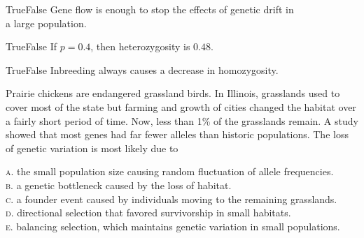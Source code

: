 \documentclass[letterpaper]{tufte-handout}
\begin{document}
\bigskip

\noindent True\hspace{1em}False\hspace{1em} Gene flow is enough to stop the effects of genetic drift in  \\
\noindent {}  a large population.

\bigskip

\noindent True\hspace{1em}False\hspace{1em} If $p=0.4$, then heterozygosity is $0.48$.

\bigskip

\noindent True\hspace{1em}False\hspace{1em} Inbreeding always causes a
decrease in homozygosity.

\bigskip
\noindent Prairie chickens are endangered grassland birds. In Illinois, 
grasslands used to cover most of the state but farming and growth of 
cities changed the habitat over a fairly short period of time. Now, 
less than 1\% of the grasslands remain. A study showed that most genes 
had far fewer alleles than historic populations. The loss of genetic 
variation is most likely due to

\smallskip

\noindent \textsc{a}. the small population size causing random fluctuation of allele frequencies.\\
\noindent \textsc{b}. a genetic bottleneck caused by the loss of habitat. \\
\noindent \textsc{c}. a founder event caused by individuals moving to the remaining grasslands. \\
\noindent \textsc{d}. directional selection that favored survivorship in small habitats. \\
\noindent \textsc{e}. balancing selection, which maintains genetic variation in small populations.
\end{document}
